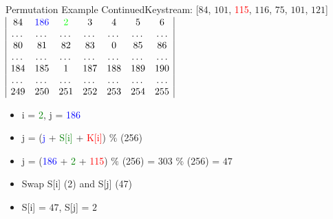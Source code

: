 \documentclass[
	aspectratio=169,	%
	onlytextwidth,		%
	t					%
	]{beamer}
\begin{document}
\begin{frame}{Permutation Example Continued}{Keystream: [$84$, $101$, \textcolor{red} {115}, $116$, $75$, $101$, $121$]}
	$\begin{array}{|ccccccc|}
		84 & \textcolor{blue} {186} & \textcolor{green}{2} & 3 & 4 & 5 & 6 \\
		\dots & \dots & \dots & \dots & \dots & \dots & \dots \\
		80 & 81 & 82 & 83 & 0 & 85 & 86 \\
		\dots & \dots & \dots & \dots & \dots & \dots & \dots \\
		184 & 185 & 1 & 187 & 188 & 189 & 190\\
		\dots & \dots & \dots & \dots & \dots & \dots & \dots \\
		249 & 250 & 251 & 252 & 253 & 254 & 255 \\
	\end{array}$
	\begin{itemize}
		\item i = \textcolor{green}{2}, j = \textcolor{blue}{186}
		\item j = (\textcolor{blue} {j} + \textcolor{green}{S[i]} + \textcolor{red}{K[i]}) $\%$ (256)
		\item j = (\textcolor{blue} {186} + \textcolor{green} {2} + \textcolor{red} {115}) $\%$ (256) = 303 $\%$ (256) = $47$
		\item Swap S[i] (2) and S[j] (47)
		\item S[i] = $47$, S[j] = $2$
	\end{itemize}
\end{frame}
\end{document}
